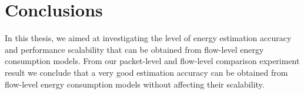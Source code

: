 \chapter{Conclusions}
\label{chapter:conclusions}

In this thesis, we aimed at investigating the level of energy estimation accuracy and performance scalability that can be obtained from flow-level energy consumption models. From our packet-level and flow-level comparison experiment result we conclude that a very good estimation accuracy can be obtained from flow-level energy consumption models without affecting their scalability.

